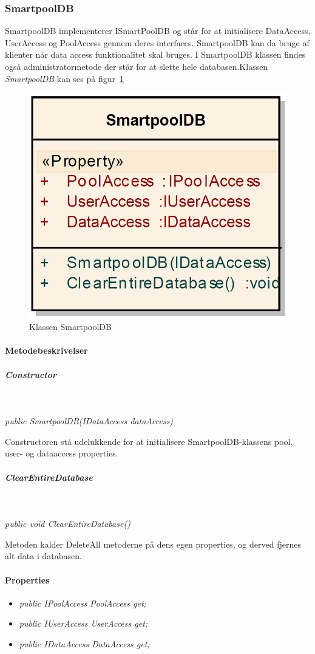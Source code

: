 \subsubsection{SmartpoolDB}
SmartpoolDB implementerer ISmartPoolDB og står for at initialisere DataAccess, UserAccess og PoolAccess gennem deres interfaces. SmartpoolDB kan da bruge af klienter når data access funktionalitet skal bruges. I SmartpoolDB klassen findes også administratormetode der står for at slette hele databasen.Klassen \textit{SmartpoolDB} kan ses på figur~\ref{fig:smartpoolDBClass}

\begin{figure}
	\centering
	\includegraphics[width=0.3\linewidth]{figs/implementering/smartpoolDBClass.PNG}
	\caption{Klassen SmartpoolDB}
	\label{fig:smartpoolDBClass}
\end{figure}

\paragraph{Metodebeskrivelser}

\subparagraph{Constructor}\

\textit{public SmartpoolDB(IDataAccess dataAccess)}

Constructoren stå udelukkende for at initialisere SmartpoolDB-klassens pool, user- og dataaccess properties.

\subparagraph{ClearEntireDatabase}\

\textit{public void ClearEntireDatabase()}

Metoden kalder DeleteAll metoderne på dens egen properties, og derved fjernes alt data i databasen.

\paragraph{Properties}

\begin{itemize}
	\item \textit{public IPoolAccess PoolAccess { get; }}
	\item \textit{public IUserAccess UserAccess { get; }}
	\item \textit{public IDataAccess DataAccess { get; }}
\end{itemize}





